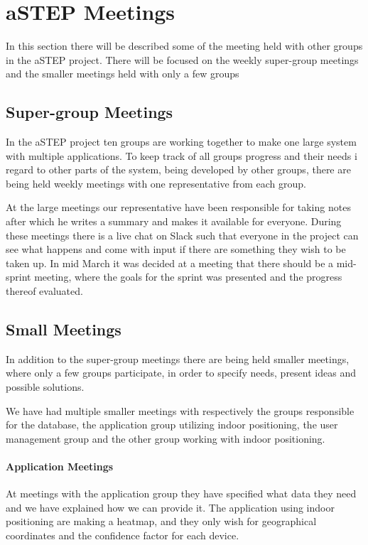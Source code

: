 \section{aSTEP Meetings}
In this section there will be described some of the meeting held with other groups in the aSTEP project. There will be focused on the weekly super-group meetings and the smaller meetings held with only a few groups

\subsection{Super-group Meetings}\label{subsec:supergroup_meetings}
In the aSTEP project ten groups are working together to make one large system with multiple applications. To keep track of all groups progress and their needs i regard to other parts of the system, being developed by other groups, there are being held weekly meetings with one representative from each group.

At the large meetings our representative have been responsible for taking notes after which he writes a summary and makes it available for everyone. During these meetings there is a live chat on Slack such that everyone in the project can see what happens and come with input if there are something they wish to be taken up. In mid March it was decided at a meeting that there should be a mid-sprint meeting, where the goals for the sprint was presented and the progress thereof evaluated.

\subsection{Small Meetings}\label{subsec:small_meetings}
In addition to the super-group meetings there are being held smaller meetings, where only a few groups participate, in order to specify needs, present ideas and possible solutions.

We have had multiple smaller meetings with respectively the groups responsible for the database, the application group utilizing indoor positioning, the user management group and the other group working with indoor positioning.
 
\paragraph{Application Meetings}
At meetings with the application group they have specified what data they need and we have explained how we can provide it. The application using indoor positioning are making a heatmap, and they only wish for geographical coordinates and the confidence factor for each device.

